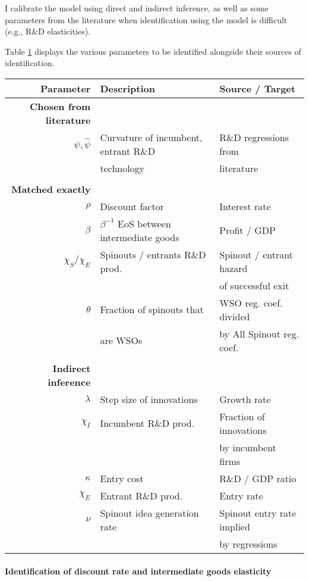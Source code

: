 \documentclass[12pt,english]{article}
\theoremstyle{remark}
\begin{document}
I calibrate the model using direct and indirect inference, as well as some parameters from the literature when identification using the model is difficult (e.g., R\&D elasticities). 

Table \ref{identification} displays the various parameters to be identified alongside their sources of identification. 

\begin{table}
	\small
	\centering
	\begin{tabular}{rll}
		\toprule \toprule 
		Parameter &  Description & Source / Target\\
		\midrule
		\textbf{Chosen from literature}& \\
		$\psi, \hat{\psi}$ & Curvature of incumbent, entrant R\&D & R\&D regressions from \\
		& technology & literature\\
		& & \\
		\textbf{Matched exactly}&  \\
		$\rho$ & Discount factor & Interest rate \\
		$\beta$ & $\beta^{-1}$ EoS between intermediate goods & Profit / GDP \\
		$\chi_S / \chi_E$ & Spinouts / entrants R\&D prod. & Spinout / entrant hazard \\
		& & of successful exit \\
		$\theta$ & Fraction of spinouts that & WSO reg. coef. divided \\
		& are WSOs & by All Spinout reg. coef. \\
		& \\
		\textbf{Indirect inference}& \\
		$\lambda$ & Step size of innovations & Growth rate \\
		$\chi_I$ & Incumbent R\&D prod. & Fraction of innovations \\
		& &  by incumbent firms \\
		$\kappa$ & Entry cost & R\&D / GDP ratio\\
		$\chi_E$ & Entrant R\&D prod. & Entry rate \\
		$\nu$ & Spinout idea generation rate & Spinout entry rate implied \\
		& & by regressions \\
		\bottomrule
	\end{tabular}
	\label{identification}
\end{table}

\paragraph{Identification of discount rate and intermediate goods elasticity}
\end{document}
